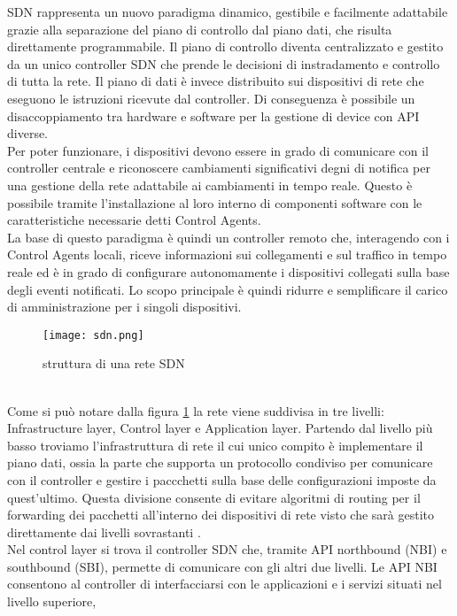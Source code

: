 SDN rappresenta un nuovo paradigma dinamico, gestibile e facilmente adattabile grazie alla separazione del piano di controllo dal piano dati, che risulta direttamente programmabile. 
Il piano di controllo diventa centralizzato e gestito da un unico controller SDN che prende le decisioni di instradamento e controllo di tutta la rete. 
Il piano di dati è invece distribuito sui dispositivi di rete che eseguono le istruzioni ricevute dal controller.
Di conseguenza è possibile un disaccoppiamento tra hardware e software per la gestione di device con API diverse.
\\Per poter funzionare, i dispositivi devono essere in grado di comunicare con il controller centrale e riconoscere cambiamenti significativi degni di notifica per una gestione della rete adattabile ai cambiamenti in tempo reale. 
Questo è possibile tramite l'installazione al loro interno di componenti software con le caratteristiche necessarie
detti Control Agents.
\\La base di questo paradigma è quindi un controller remoto che, interagendo con i Control Agents
locali, riceve informazioni sui collegamenti e sul traffico in tempo reale ed è in grado di
configurare autonomamente i dispositivi collegati sulla base degli eventi notificati. Lo scopo
principale è quindi ridurre e semplificare il carico di amministrazione per i singoli dispositivi.
\begin{figure}[h]
    \centering
   \texttt{[image: sdn.png]}
    \caption{struttura di una rete SDN}
    \label{fig:sdnF}
\end{figure}
\\Come si può notare dalla figura \ref{fig:sdnF} la rete viene suddivisa in tre livelli: Infrastructure layer, Control layer e Application layer.
Partendo dal livello più basso troviamo l'infrastruttura di rete il cui unico compito è implementare il piano dati, ossia la parte che supporta un protocollo condiviso per comunicare con il controller e gestire
i paccchetti sulla base delle configurazioni imposte da quest'ultimo. 
Questa divisione consente di evitare algoritmi
di routing per il forwarding dei pacchetti all'interno dei dispositivi di rete visto che sarà
gestito direttamente dai livelli sovrastanti \cite{tesiSDN:2017}. 
\\Nel control layer si trova il controller SDN che, tramite API northbound (NBI) e southbound (SBI), permette di comunicare con
gli altri due livelli. Le API NBI consentono al controller di interfacciarsi con le applicazioni e i servizi situati nel livello superiore,

